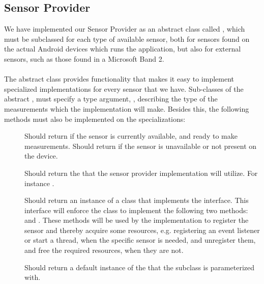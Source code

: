 \subsection{Sensor Provider}
\label{sub:providing_sensor_data_implementation}
We have implemented our Sensor Provider as an abstract class called , which must be subclassed for each type of available sensor, both for sensors found on the actual Android devices which runs the application, but also for external sensors, such as those found in a Microsoft Band 2. 
\\\\
The abstract class provides functionality that makes it easy to implement specialized implementations for every sensor that we have. Sub-classes of the abstract , must specify a type argument, , describing the type of the measurements which the implementation will make. Besides this, the following methods must also be implemented on the specializations:


\begin{description}
	\item[] Should return  if the sensor is currently available, and ready to make measurements. Should return  if the sensor is unavailable or not present on the device.

	\item[] Should return the  that the sensor provider implementation will utilize. For instance .

	\item[] Should return an instance of a class that implements the  interface. This interface will enforce the class to implement the following two methods:  and . These methods will be used by the  implementation to register the sensor and thereby acquire some resources, e.g. registering an event listener or start a thread, when the specific sensor is needed, and unregister them, and free the required resources, when they are not.

  \item[] Should return a default instance of the  that the subclass is parameterized with.

\end{description}

